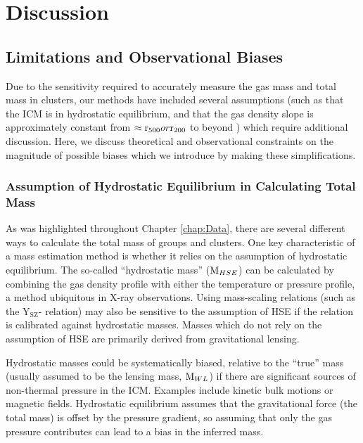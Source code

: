 \chapter{Discussion}
\label{chap:Discussion}

\section{Limitations and Observational Biases}
\label{sec:Limitations}

Due to the sensitivity required to accurately measure the gas
mass and total mass in clusters, our methods have included several
assumptions (such as that the ICM is in hydrostatic equilibrium, and
that the gas density slope is approximately constant from
$\approx\textrm{r\ensuremath{_{500}}}{} or \textrm{r\ensuremath{_{200}}}{}$ to beyond \rvir{}) which require
additional discussion. Here, we discuss theoretical and observational
constraints on the magnitude of possible biases which we introduce by
making these simplifications.

\subsection{Assumption of Hydrostatic Equilibrium in Calculating Total
Mass}
\label{sec:Limitations.HSE}
As was highlighted throughout Chapter \ref{chap:Data}, there are
several different ways to calculate the total mass of groups and
clusters. One key characteristic of a mass estimation method is
whether it relies on the assumption of hydrostatic equilibrium. The
so-called ``hydrostatic mass'' ($\textrm{M}{}_{HSE}$) can be calculated by combining the gas
density profile with either the temperature or pressure profile, a
method ubiquitous in X-ray observations. Using mass-scaling relations
(such as the Y$_\textrm{SZ}$-\Mfive{} relation) may also be sensitive
to the assumption of HSE if the relation is calibrated against
hydrostatic masses. Masses which do not rely on the assumption of HSE
are primarily derived from gravitational lensing.

Hydrostatic masses could be systematically biased, relative to the
``true'' mass (usually assumed to be the lensing mass, $\textrm{M}{}_{WL}$)
if there are significant sources of non-thermal pressure in the
ICM. Examples include kinetic bulk motions or magnetic
fields. Hydrostatic equilibrium assumes that the gravitational force
(the total mass) is offset by the pressure gradient, so assuming that
only the gas pressure contributes can lead to a bias in the inferred
mass.

